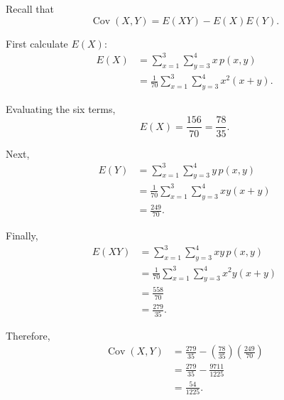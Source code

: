 \documentclass[11pt]{article}
\newenvironment{solution}{
    \par
    \begin{tcolorbox}[
        colback=white,
        colframe=uwgold,
        boxrule=0.7pt,
        arc=2mm,
        left=3mm,
        right=3mm,
        top=2mm,
        bottom=2mm,
        breakable,
        before skip=0.5em,
        after skip=1em,
        title=\textbf{Solution},
        coltitle=uwpurple,
        fonttitle=\bfseries
    ]
}{
    \end{tcolorbox}
}
\begin{document}
\begin{solution}

Recall that
\[
\operatorname{Cov}(X,Y)
=
E(XY)-E(X)E(Y).
\]

First calculate \(E(X)\):
\[
\begin{aligned}
E(X)
&=
\sum_{x=1}^{3}
\sum_{y=3}^{4}
x\,p(x,y)\\
&=
\frac1{70}
\sum_{x=1}^{3}
\sum_{y=3}^{4}
x^2(x+y).
\end{aligned}
\]

Evaluating the six terms,
\[
E(X)
=
\frac{156}{70}
=
\frac{78}{35}.
\]

Next,
\[
\begin{aligned}
E(Y)
&=
\sum_{x=1}^{3}
\sum_{y=3}^{4}
y\,p(x,y)\\
&=
\frac1{70}
\sum_{x=1}^{3}
\sum_{y=3}^{4}
xy(x+y)\\
&=
\frac{249}{70}.
\end{aligned}
\]

Finally,
\[
\begin{aligned}
E(XY)
&=
\sum_{x=1}^{3}
\sum_{y=3}^{4}
xy\,p(x,y)\\
&=
\frac1{70}
\sum_{x=1}^{3}
\sum_{y=3}^{4}
x^2y(x+y)\\
&=
\frac{558}{70}\\
&=
\frac{279}{35}.
\end{aligned}
\]

Therefore,
\[
\begin{aligned}
\operatorname{Cov}(X,Y)
&=
\frac{279}{35}
-
\left(\frac{78}{35}\right)
\left(\frac{249}{70}\right)\\
&=
\frac{279}{35}
-
\frac{9711}{1225}\\
&=
\frac{54}{1225}.
\end{aligned}
\]

 

\end{solution}


\end{document}
